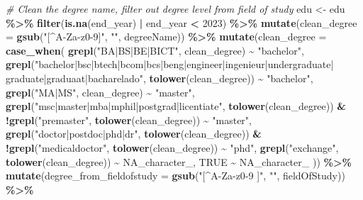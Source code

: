 \documentclass[11pt,]{article}
\newenvironment{Shaded}{\begin{snugshade}}{\end{snugshade}}
\newcommand{\AttributeTok}[1]{\textcolor[rgb]{0.13,0.29,0.53}{#1}}
\newcommand{\CommentTok}[1]{\textcolor[rgb]{0.56,0.35,0.01}{\textit{#1}}}
\newcommand{\ConstantTok}[1]{\textcolor[rgb]{0.56,0.35,0.01}{#1}}
\newcommand{\DecValTok}[1]{\textcolor[rgb]{0.00,0.00,0.81}{#1}}
\newcommand{\FunctionTok}[1]{\textcolor[rgb]{0.13,0.29,0.53}{\textbf{#1}}}
\newcommand{\NormalTok}[1]{#1}
\newcommand{\OtherTok}[1]{\textcolor[rgb]{0.56,0.35,0.01}{#1}}
\newcommand{\SpecialCharTok}[1]{\textcolor[rgb]{0.81,0.36,0.00}{\textbf{#1}}}
\newcommand{\StringTok}[1]{\textcolor[rgb]{0.31,0.60,0.02}{#1}}
\begin{document}
\begin{Shaded}
\begin{Highlighting}[]
\CommentTok{\# Clean the degree name, filter out degree level from field of study}
\NormalTok{edu }\OtherTok{\textless{}{-}}\NormalTok{ edu }\SpecialCharTok{\%\textgreater{}\%} 
  \FunctionTok{filter}\NormalTok{(}\FunctionTok{is.na}\NormalTok{(end\_year) }\SpecialCharTok{|}\NormalTok{ end\_year }\SpecialCharTok{\textless{}} \DecValTok{2023}\NormalTok{) }\SpecialCharTok{\%\textgreater{}\%} 
  \FunctionTok{mutate}\NormalTok{(}\AttributeTok{clean\_degree =} \FunctionTok{gsub}\NormalTok{(}\StringTok{"[\^{}A{-}Za{-}z0{-}9]"}\NormalTok{, }\StringTok{""}\NormalTok{, degreeName)) }\SpecialCharTok{\%\textgreater{}\%} 
  \FunctionTok{mutate}\NormalTok{(}\AttributeTok{clean\_degree =} \FunctionTok{case\_when}\NormalTok{(}
    \FunctionTok{grepl}\NormalTok{(}\StringTok{"BA|BS|BE|BICT"}\NormalTok{, clean\_degree) }\SpecialCharTok{\textasciitilde{}} \StringTok{"bachelor"}\NormalTok{,}
    \FunctionTok{grepl}\NormalTok{(}\StringTok{"bachelor|bsc|btech|bcom|bcs|beng|engineer|ingenieur|undergraduate|}
\StringTok{          graduate|graduaat|bacharelado"}\NormalTok{, }\FunctionTok{tolower}\NormalTok{(clean\_degree)) }\SpecialCharTok{\textasciitilde{}} \StringTok{"bachelor"}\NormalTok{,}
    \FunctionTok{grepl}\NormalTok{(}\StringTok{"MA|MS"}\NormalTok{, clean\_degree) }\SpecialCharTok{\textasciitilde{}} \StringTok{"master"}\NormalTok{,}
    \FunctionTok{grepl}\NormalTok{(}\StringTok{"msc|master|mba|mphil|postgrad|licentiate"}\NormalTok{, }\FunctionTok{tolower}\NormalTok{(clean\_degree)) }\SpecialCharTok{\&} 
      \SpecialCharTok{!}\FunctionTok{grepl}\NormalTok{(}\StringTok{"premaster"}\NormalTok{, }\FunctionTok{tolower}\NormalTok{(clean\_degree)) }\SpecialCharTok{\textasciitilde{}} \StringTok{"master"}\NormalTok{,}
    \FunctionTok{grepl}\NormalTok{(}\StringTok{"doctor|postdoc|phd|dr"}\NormalTok{, }\FunctionTok{tolower}\NormalTok{(clean\_degree)) }\SpecialCharTok{\&} 
      \SpecialCharTok{!}\FunctionTok{grepl}\NormalTok{(}\StringTok{"medicaldoctor"}\NormalTok{, }\FunctionTok{tolower}\NormalTok{(clean\_degree)) }\SpecialCharTok{\textasciitilde{}} \StringTok{"phd"}\NormalTok{,}
    \FunctionTok{grepl}\NormalTok{(}\StringTok{"exchange"}\NormalTok{, }\FunctionTok{tolower}\NormalTok{(clean\_degree)) }\SpecialCharTok{\textasciitilde{}} \ConstantTok{NA\_character\_}\NormalTok{,}
    \ConstantTok{TRUE} \SpecialCharTok{\textasciitilde{}} \ConstantTok{NA\_character\_}
\NormalTok{  )) }\SpecialCharTok{\%\textgreater{}\%} 
  \FunctionTok{mutate}\NormalTok{(}\AttributeTok{degree\_from\_fieldofstudy =} \FunctionTok{gsub}\NormalTok{(}\StringTok{"[\^{}A{-}Za{-}z0{-}9 ]"}\NormalTok{, }\StringTok{""}\NormalTok{, fieldOfStudy)) }\SpecialCharTok{\%\textgreater{}\%} 

\end{Highlighting}
\end{Shaded}
\end{document}
